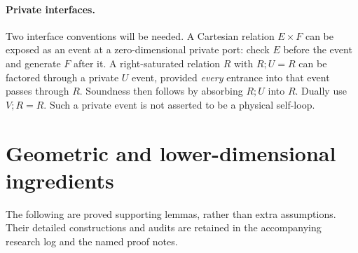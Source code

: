 \documentclass[11pt,a4paper]{article}
\theoremstyle{remark}
\begin{document}
\paragraph{Private interfaces.}

Two interface conventions will be needed. A Cartesian relation \(E\times F\) can be exposed as an event at a zero-dimensional private port: check \(E\) before the event and generate \(F\) after it. A right-saturated relation \(R\) with \(R;U=R\) can be factored through a private \(U\) event, provided \emph{every} entrance into that event passes through \(R\). Soundness then follows by absorbing \(R;U\) into \(R\). Dually use \(V;R=R\). Such a private event is not asserted to be a physical self-loop.

\section{Geometric and lower-dimensional ingredients}\label{sec:ingredients}

The following are proved supporting lemmas, rather than extra assumptions. Their detailed constructions and audits are retained in the accompanying research log and the named proof notes.
\end{document}
